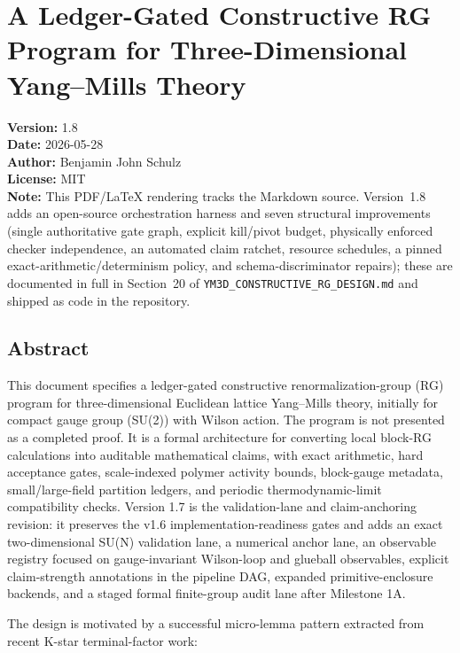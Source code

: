\documentclass[
]{article}
\author{}
\date{}
\begin{document}
\section{A Ledger-Gated Constructive RG Program for Three-Dimensional
Yang--Mills
Theory}\label{a-ledger-gated-constructive-rg-program-for-three-dimensional-yangmills-theory}

\textbf{Version:} 1.8\\
\textbf{Date:} 2026-05-28\\
\textbf{Author:} Benjamin John Schulz\\
\textbf{License:} MIT\\
\textbf{Note:} This PDF/\LaTeX{} rendering tracks the Markdown source. Version~1.8 adds an open-source orchestration harness and seven structural improvements (single authoritative gate graph, explicit kill/pivot budget, physically enforced checker independence, an automated claim ratchet, resource schedules, a pinned exact-arithmetic/determinism policy, and schema-discriminator repairs); these are documented in full in Section~20 of \texttt{YM3D\_CONSTRUCTIVE\_RG\_DESIGN.md} and shipped as code in the repository.

\subsection{Abstract}\label{abstract}

This document specifies a ledger-gated constructive
renormalization-group (RG) program for three-dimensional Euclidean
lattice Yang--Mills theory, initially for compact gauge group (SU(2))
with Wilson action. The program is not presented as a completed proof.
It is a formal architecture for converting local block-RG calculations
into auditable mathematical claims, with exact arithmetic, hard
acceptance gates, scale-indexed polymer activity bounds, block-gauge
metadata, small/large-field partition ledgers, and periodic
thermodynamic-limit compatibility checks. Version 1.7 is the
validation-lane and claim-anchoring revision: it preserves the v1.6
implementation-readiness gates and adds an exact two-dimensional SU(N)
validation lane, a numerical anchor lane, an observable registry focused
on gauge-invariant Wilson-loop and glueball observables, explicit
claim-strength annotations in the pipeline DAG, expanded
primitive-enclosure backends, and a staged formal finite-group audit
lane after Milestone 1A.

The design is motivated by a successful micro-lemma pattern extracted
from recent K-star terminal-factor work:
\end{document}
